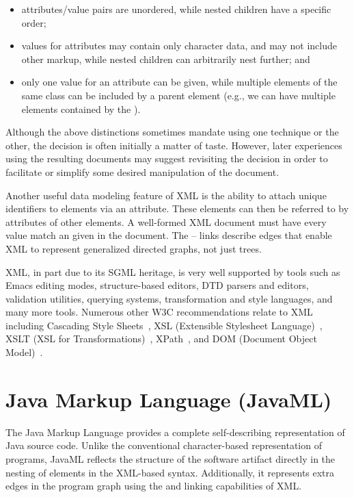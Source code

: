 \documentclass{article}
\begin{document}
\begin{multicols}{2}
\begin{itemize}

\item attributes/value pairs are unordered, while nested children have a
specific order;

\item values for attributes may contain only character data, and may not
      include other markup, while nested children can arbitrarily nest
      further; and
      
\item only one value for an attribute can be given, while multiple
      elements of the same class can be included by a parent element
      (e.g., we can have multiple  elements contained by
      the ).

\end{itemize}

Although the above distinctions sometimes mandate using one technique or
the other, the decision is often initially a matter of taste.  However,
later experiences using the resulting documents may suggest revisiting
the decision in order to facilitate or simplify some desired
manipulation of the document.

Another useful data modeling feature of XML is the ability to attach
unique identifiers to elements via an  attribute.  These
elements can then be referred to by  attributes of other
elements.  A well-formed XML document must have every 
value match an  given in the document.  The
-- links describe edges that enable XML to
represent generalized directed graphs, not just trees.

XML, in part due to its SGML heritage, is very well supported by tools
such as Emacs editing modes, structure-based editors, DTD parsers and
editors, validation utilities, querying systems, transformation and
style languages, and many more tools.  Numerous other W3C
recommendations relate to XML including Cascading Style
Sheets~\cite{CSS2}, XSL (Extensible Stylesheet Language)~\cite{XSL},
XSLT (XSL for Transformations)~\cite{XSLT}, XPath~\cite{XPath}, and DOM
(Document Object Model)~\cite{DOM}.

\section{Java Markup Language (JavaML)}
\label{sec-javaml}

The Java Markup Language provides a complete self-describing
representation of Java source code.  Unlike the conventional
character-based representation of programs, JavaML reflects the
structure of the software artifact directly in the nesting of elements
in the XML-based syntax.  Additionally, it represents extra edges in the 
program graph using the  and  linking
capabilities of XML.


\end{multicols}
\end{document}
